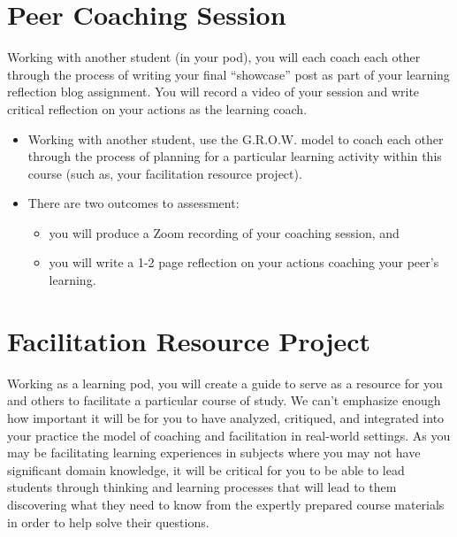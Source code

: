 \documentclass[
]{book}
\providecommand{\tightlist}{%
  \setlength{\itemsep}{0pt}\setlength{\parskip}{0pt}}
\begin{document}
\hypertarget{peer-coaching-session}{%
\section*{Peer Coaching Session}\label{peer-coaching-session}}

Working with another student (in your pod), you will each coach each other through the process of writing your final ``showcase'' post as part of your learning reflection blog assignment. You will record a video of your session and write critical reflection on your actions as the learning coach.

\begin{itemize}
\tightlist
\item
  Working with another student, use the G.R.O.W. model to coach each other through the process of planning for a particular learning activity within this course (such as, your facilitation resource project).
\item
  There are two outcomes to assessment:

  \begin{itemize}
  \tightlist
  \item
    you will produce a Zoom recording of your coaching session, and
  \item
    you will write a 1-2 page reflection on your actions coaching your peer's learning.
  \end{itemize}
\end{itemize}

\hypertarget{facilitation-resource-project}{%
\section*{Facilitation Resource Project}\label{facilitation-resource-project}}

Working as a learning pod, you will create a guide to serve as a resource for you and others to facilitate a particular course of study. We can't emphasize enough how important it will be for you to have analyzed, critiqued, and integrated into your practice the model of coaching and facilitation in real-world settings. As you may be facilitating learning experiences in subjects where you may not have significant domain knowledge, it will be critical for you to be able to lead students through thinking and learning processes that will lead to them discovering what they need to know from the expertly prepared course materials in order to help solve their questions.
\end{document}
